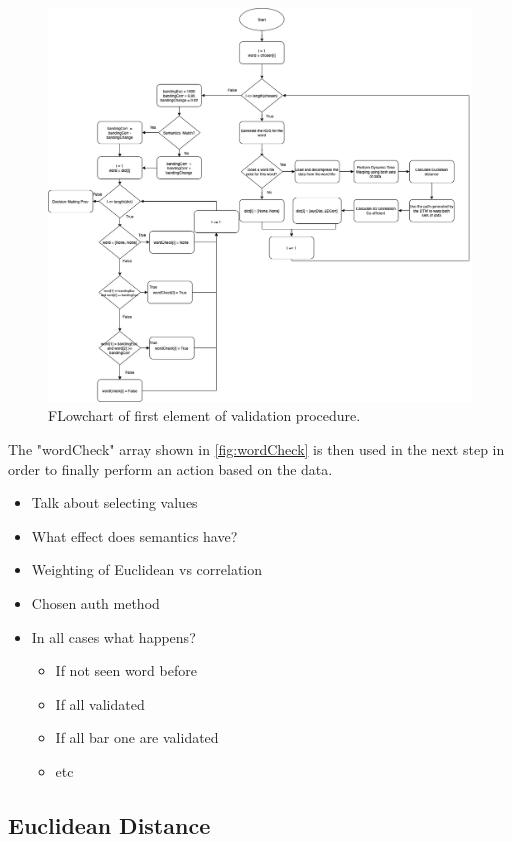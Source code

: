 \documentclass[10pt,a4paper]{report}
\begin{document}
\begin{figure}
	\centering
	\includegraphics[scale=0.30]{ValidationProc}
	\caption{FLowchart of first element of validation procedure.}
	\label{fig:valProc}
\end{figure}

The "wordCheck" array shown in \ref{fig:wordCheck} is then used in the next step in order to finally perform an action based on the data. 


\begin{itemize}
	\item Talk about selecting values
	\item What effect does semantics have?
	\item Weighting of Euclidean vs correlation
	\item Chosen auth method
	\item In all cases what happens?
	\begin{itemize}
		\item If not seen word before
		\item If all validated
		\item If all bar one are validated
		\item etc
	\end{itemize}
\end{itemize}
\subsection{Euclidean Distance}
\end{document}
